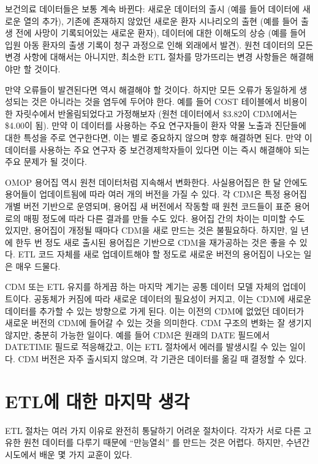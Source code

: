 \documentclass[11pt]{book}
\theoremstyle{definition}
\theoremstyle{definition}
\theoremstyle{definition}
\theoremstyle{remark}
\begin{document}
보건의료 데이터들은 보통 계속 바뀐다: 새로운 데이터의 출시 (예를 들어
데이터에 새로운 열의 추가), 기존에 존재하지 않았던 새로운 환자
시나리오의 출현 (예를 들어 출생 전에 사망이 기록되어있는 새로운 환자),
데이터에 대한 이해도의 상승 (예를 들어 입원 아동 환자의 출생 기록이 청구
과정으로 인해 외래에서 발견). 원천 데이터의 모든 변경 사항에 대해서는
아니지만, 최소한 ETL 절차를 망가뜨리는 변경 사항들은 해결해야만 할
것이다.

만약 오류들이 발견된다면 역시 해결해야 할 것이다. 하지만 모든 오류가
동일하게 생성되는 것은 아니라는 것을 염두에 두어야 한다. 예를 들어 COST
테이블에서 비용이 한 자릿수에서 반올림되었다고 가정해보자 (원천
데이터에서 \$3.82이 CDM에서는 \$4.00이 됨). 만약 이 데이터를 사용하는
주요 연구자들이 환자 약물 노출과 진단들에 대한 특성을 주로 연구한다면,
이는 별로 중요하지 않으며 향후 해결하면 된다. 만약 이 데이터를 사용하는
주요 연구자 중 보건경제학자들이 있다면 이는 즉시 해결해야 되는 주요
문제가 될 것이다.

OMOP 용어집 역시 원천 데이터처럼 지속해서 변화한다. 사실용어집은 한 달
안에도 용어들이 업데이트됨에 따라 여러 개의 버전을 가질 수 있다. 각
CDM은 특정 용어집 개별 버전 기반으로 운영되며, 용어집 새 버전에서 작동할
때 원천 코드들이 표준 용어로의 매핑 정도에 따라 다른 결과를 만들 수도
있다. 용어집 간의 차이는 미미할 수도 있지만, 용어집이 개정될 때마다
CDM을 새로 만드는 것은 불필요하다. 하지만, 일 년에 한두 번 정도 새로
출시된 용어집은 기반으로 CDM을 재가공하는 것은 좋을 수 있다. ETL 코드
자체를 새로 업데이트해야 할 정도로 새로운 버전의 용어집이 나오는 일은
매우 드물다.

CDM 또는 ETL 유지를 하게끔 하는 마지막 계기는 공통 데이터 모델 자체의
업데이트이다. 공동체가 커짐에 따라 새로운 데이터의 필요성이 커지고, 이는
CDM에 새로운 데이터를 추가할 수 있는 방향으로 가게 된다. 이는 이전의
CDM에 없었던 데이터가 새로운 버전의 CDM에 들어갈 수 있는 것을 의미한다.
CDM 구조의 변화는 잘 생기지 않지만, 충분히 가능한 일이다. 예를 들어
CDM은 원래의 DATE 필드에서 DATETIME 필드로 적응해갔고, 이는 ETL 절차에서
에러를 발생시킬 수 있는 일이다. CDM 버전은 자주 출시되지 않으며, 각
기관은 데이터를 옮길 때 결정할 수 있다.

\section{ETL에 대한 마지막 생각}\label{etl---}

ETL 절차는 여러 가지 이유로 완전히 통달하기 어려운 절차이다. 각자가 서로
다른 고유한 원천 데이터를 다루기 때문에 ``만능열쇠'' 를 만드는 것은
어렵다. 하지만, 수년간 시도에서 배운 몇 가지 교훈이 있다.
\end{document}

